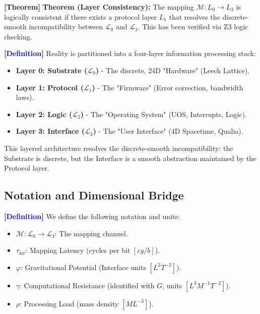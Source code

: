 \documentclass[11pt,titlepage]{article}
\newcommand{\substrate}{\mathcal{L}_0}
\newcommand{\protocol}{\mathcal{L}_1}
\newcommand{\logic}{\mathcal{L}_2}
\newcommand{\interface}{\mathcal{L}_3}
\newcommand{\tagdef}{\textcolor{blue}{\textbf{[Definition]}} }
\newcommand{\tagtheo}{\textcolor{green!60!black}{\textbf{[Theorem]}} }
\begin{document}
\tagtheo \textbf{Theorem (Layer Consistency):} The mapping $\mathcal{M}: L_0 \to L_3$ is logically consistent if there exists a protocol layer $L_1$ that resolves the discrete-smooth incompatibility between $\substrate$ and $\interface$. This has been verified via Z3 logic checking.

\tagdef Reality is partitioned into a four-layer information processing stack:
\begin{itemize}
    
\item \textbf{Layer 0: Substrate ($\substrate$)} - The discrete, 24D "Hardware" (Leech Lattice).
    
\item \textbf{Layer 1: Protocol ($\protocol$)} - The "Firmware" (Error correction, bandwidth laws).
    
\item \textbf{Layer 2: Logic ($\logic$)} - The "Operating System" (UOS, Interrupts, Logic).
    
\item \textbf{Layer 3: Interface ($\interface$)} - The "User Interface" (4D Spacetime, Qualia).
\end{itemize}
This layered architecture resolves the discrete-smooth incompatibility: the Substrate is discrete, but the Interface is a smooth abstraction maintained by the Protocol layer.


\subsection{Notation and Dimensional Bridge}
\tagdef We define the following notation and units:
\begin{itemize}
    
\item $\mathcal{M}: \substrate \to \interface$: The mapping channel.
    
\item $\tau_{lat}$: Mapping Latency (cycles per bit $[cy/b]$).
    
\item $\varphi$: Gravitational Potential (Interface units $[L^2 T^{-2}]$).
    
\item $\gamma$: Computational Resistance (identified with $G$, units $[L^3 M^{-1} T^{-2}]$).
    
\item $\rho$: Processing Load (mass density $[M L^{-3}]$).
\end{itemize}
\end{document}
